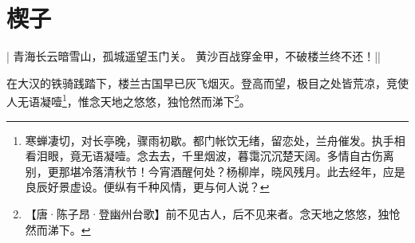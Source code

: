 \chapter*{楔子}
\label{chap:preface}

\begin{pcontent}{|}
青海长云暗雪山，孤城遥望玉门关。
黄沙百战穿金甲，不破楼兰终不还！||
\end{pcontent}

在大汉的铁骑践踏下，楼兰古国早已灰飞烟灭。登高而望，极目之处皆荒凉，竞使人无语凝噎\footnote{寒蝉凄切，对长亭晚，骤雨初歇。都门帐饮无绪，留恋处，兰舟催发。执手相看泪眼，竟无语凝噎。念去去，千里烟波，暮霭沉沉楚天阔。\cispace 多情自古伤离别，更那堪冷落清秋节！今宵酒醒何处？杨柳岸，晓风残月。此去经年，应是良辰好景虚设。便纵有千种风情，更与何人说？}，惟念天地之悠悠，独怆然而涕下\footnote{【唐·陈子昂·登幽州台歌】前不见古人，后不见来者。念天地之悠悠，独怆然而涕下。}。

